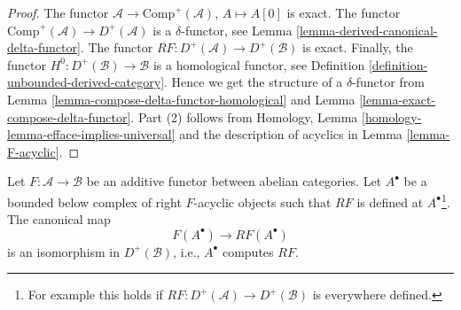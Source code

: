 \begin{proof}
The functor $\mathcal{A} \to \text{Comp}^{+}(\mathcal{A})$,
$A \mapsto A[0]$ is exact. The functor
$\text{Comp}^{+}(\mathcal{A}) \to D^{+}(\mathcal{A})$
is a $\delta$-functor, see
Lemma \ref{lemma-derived-canonical-delta-functor}.
The functor $RF : D^{+}(\mathcal{A}) \to D^{+}(\mathcal{B})$ is exact.
Finally, the functor $H^0 : D^{+}(\mathcal{B}) \to \mathcal{B}$
is a homological functor, see
Definition \ref{definition-unbounded-derived-category}.
Hence we get the structure of a $\delta$-functor from
Lemma \ref{lemma-compose-delta-functor-homological}
and
Lemma \ref{lemma-exact-compose-delta-functor}.
Part (2) follows from
Homology, Lemma \ref{homology-lemma-efface-implies-universal}
and the description of acyclics in
Lemma \ref{lemma-F-acyclic}.
\end{proof}

\begin{lemma}
\label{lemma-leray-acyclicity}
Let $F : \mathcal{A} \to \mathcal{B}$ be an additive functor
between abelian categories. Let $A^\bullet$ be a bounded below complex
of right $F$-acyclic objects such that $RF$ is defined at
$A^\bullet$\footnote{For example this holds if
$RF : D^{+}(\mathcal{A}) \to D^{+}(\mathcal{B})$ is everywhere defined.}.
The canonical map
$$
F(A^\bullet) \longrightarrow RF(A^\bullet)
$$
is an isomorphism in $D^{+}(\mathcal{B})$, i.e., $A^\bullet$ computes
$RF$.
\end{lemma}

